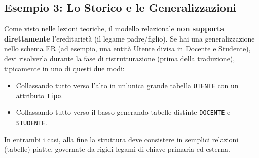 \subsection{Esempio 3: Lo Storico e le Generalizzazioni}
Come visto nelle lezioni teoriche, il modello relazionale \textbf{non supporta direttamente} l'ereditarietà (il legame padre/figlio). Se hai una generalizzazione nello schema ER (ad esempio, una entità Utente divisa in Docente e Studente), devi risolverla durante la fase di ristrutturazione (prima della traduzione), tipicamente in uno di questi due modi:
\begin{itemize}
    \item Collassando tutto verso l'alto in un'unica grande tabella \texttt{UTENTE} con un attributo \texttt{Tipo}.
    \item Collassando tutto verso il basso generando tabelle distinte \texttt{DOCENTE} e \texttt{STUDENTE}.
\end{itemize}
In entrambi i casi, alla fine la struttura deve consistere in semplici relazioni (tabelle) piatte, governate da rigidi legami di chiave primaria ed esterna.
